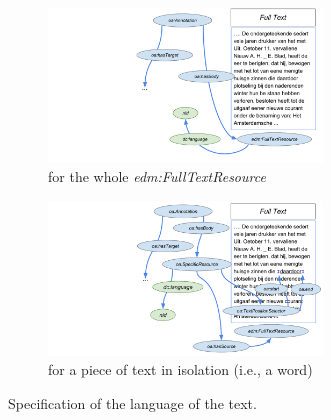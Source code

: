 \documentclass[a4paper,UKenglish,cleveref, autoref]{oasics-v2019}
\begin{document}
\begin{figure}
  \begin{subfigure}[t]{0.5\textwidth}
    \centering
    \includegraphics[width=0.8\textwidth]{Fig7a}
    \caption{for the whole \emph{edm:FullTextResource}}
  \end{subfigure}\hfill
  \begin{subfigure}[t]{0.5\textwidth}
    \centering
    \includegraphics[width=0.8\textwidth]{Fig7b}
    \caption{for a piece of text in isolation (i.e., a word)}
  \end{subfigure}
  \caption{Specification of the language of the text.}\label{fig:example}\label{fig:languagespecification}
\end{figure}
\end{document}
